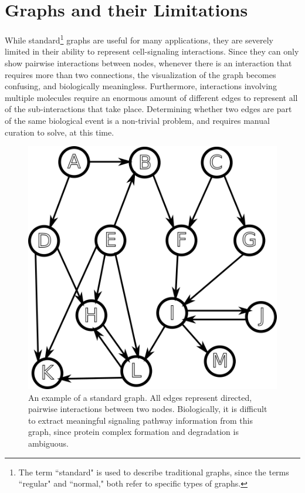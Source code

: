 \documentclass[12pt,twoside]{reedthesis}
\theoremstyle{definition}
\begin{document}
\section{Graphs and their Limitations}

While standard\footnote{The term ``standard" is used to describe traditional graphs, since the terms ``regular" and ``normal," both refer to specific types of graphs.} graphs are useful for many applications, they are severely limited in their ability to represent cell-signaling interactions.  Since they can only show pairwise interactions between nodes, whenever there is an interaction that requires more than two connections, the visualization of the graph becomes confusing, and biologically meaningless.  Furthermore, interactions involving multiple molecules require an enormous amount of different edges to represent all of the sub-interactions that take place.  Determining whether two edges are part of the same biological event is a non-trivial problem, and requires manual curation to solve, at this time.\par

\begin{figure}[thbp]
  \begin{center}
    \includegraphics[width=\textwidth/2]{example-standard-graph}
  \caption[A standard graph]{An example of a standard graph. All edges represent directed, pairwise interactions between two nodes. Biologically, it is difficult to extract meaningful signaling pathway information from this graph, since protein complex formation and degradation is ambiguous.}
  \label{fig:example-standard-graph}
  \end{center}
\end{figure}
\end{document}
